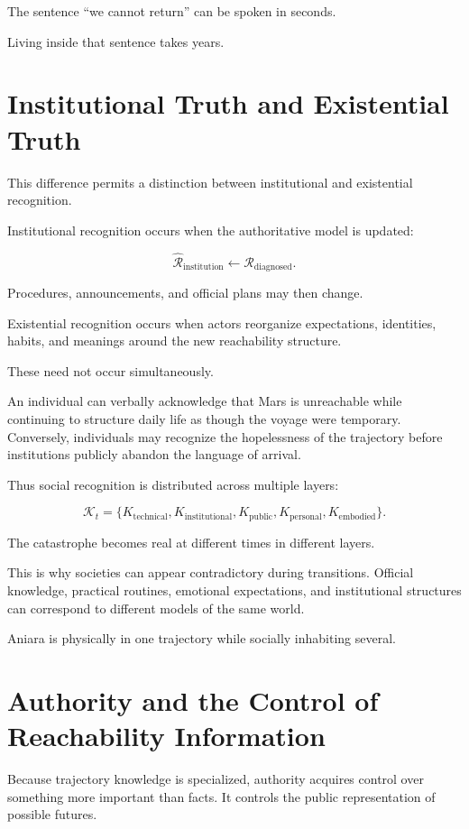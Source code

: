 \documentclass[11pt,oneside]{book}
\theoremstyle{definition}
\theoremstyle{remark}
\newcommand{\R}{\mathcal{R}}
\begin{document}
The sentence ``we cannot return'' can be spoken in seconds.

Living inside that sentence takes years.

\section{Institutional Truth and Existential Truth}

This difference permits a distinction between institutional and existential recognition.

Institutional recognition occurs when the authoritative model is updated:

\[
\widehat{\R}_{\mathrm{institution}}
\leftarrow
\R_{\mathrm{diagnosed}}.
\]

Procedures, announcements, and official plans may then change.

Existential recognition occurs when actors reorganize expectations, identities, habits, and meanings around the new reachability structure.

These need not occur simultaneously.

An individual can verbally acknowledge that Mars is unreachable while continuing to structure daily life as though the voyage were temporary. Conversely, individuals may recognize the hopelessness of the trajectory before institutions publicly abandon the language of arrival.

Thus social recognition is distributed across multiple layers:

\[
\mathcal K_t
=
\{
K_{\mathrm{technical}},
K_{\mathrm{institutional}},
K_{\mathrm{public}},
K_{\mathrm{personal}},
K_{\mathrm{embodied}}
\}.
\]

The catastrophe becomes real at different times in different layers.

This is why societies can appear contradictory during transitions. Official knowledge, practical routines, emotional expectations, and institutional structures can correspond to different models of the same world.

Aniara is physically in one trajectory while socially inhabiting several.

\section{Authority and the Control of Reachability Information}

Because trajectory knowledge is specialized, authority acquires control over something more important than facts. It controls the public representation of possible futures.
\end{document}
